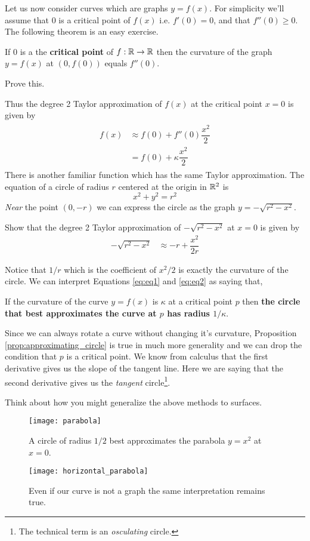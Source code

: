 Let us now consider curves which are graphs $y=f(x)$. For simplicity we'll assume that 0 is a critical point of $f(x)$ i.e. $f'(0) = 0$, and that $f''(0) \ge 0$. The following theorem is an easy exercise.
\begin{thm}
  If $0$ is a the \textbf{critical point} of $f: \mathbb{R} \rightarrow \mathbb{R}$ then the curvature of the graph $y=f(x)$ at $(0,f(0))$ equals ${f''(0)}$.
\end{thm}
\begin{ques}
	Prove this.
\end{ques}
\noindent Thus the degree 2 Taylor approximation of $ f(x) $ at the critical point $ x=0$ is given by
\begin{align}
	\label{eq:eq2}
	\begin{split}
	f(x) &\approx f(0) + f''(0) \dfrac{x^2}{2} \\
  &=f(0) + \kappa \dfrac{x^2}{2}
\end{split}
\end{align}
There is another familiar function which has the same Taylor approximation. The equation of a circle of radius $ r$ centered at the origin in $ \mathbb{R}^2$ is $$ x^2 + y^2 = r^2 $$
\emph{Near} the point $(0,-r)$ we can express the circle as the graph $ y = -\sqrt{r^2 - x^2}$.
\begin{ques}
	Show that the degree 2 Taylor approximation of $ -\sqrt{r^2 - x^2} $ at $ x=0$ is given by
	\begin{align}
		\label{eq:eq1}
		-\sqrt{r^2 - x^2} & \approx -r + \dfrac{x^2}{2r}
	\end{align}
\end{ques}
Notice that $ 1/r$ which is the coefficient of $ x^2/2$ is exactly the curvature of the circle. We can interpret Equations \eqref{eq:eq1} and \eqref{eq:eq2} as saying that,
\begin{prop}
	\label{prop:approximating_circle}
	 If the curvature of the curve $ y=f(x)$ is $ \kappa$ at a critical point $p$ then \textbf{the circle that best approximates the curve at $p$ has radius $ 1/\kappa$}.
\end{prop}
Since we can always rotate a curve without changing it's curvature, Proposition \ref{prop:approximating_circle} is true in much more generality and we can drop the condition that $p$ is a critical point. We know from calculus that the first derivative gives us the slope of the tangent line. Here we are saying that the second derivative gives us the \emph{tangent} circle\footnote{The technical term is an \emph{osculating} circle.}.
\begin{ques}
	Think about how you might generalize the above methods to surfaces.
\end{ques}
\begin{figure}[H]
	\centering
		\texttt{[image: parabola]}
		\caption{A circle of radius $1/2$ best approximates the parabola $y=x^2$ at $x=0$.}
\end{figure}
\begin{figure}[H]
		\centering
		\texttt{[image: horizontal\_parabola]}
		\caption{Even if our curve is not a graph the same interpretation remains true.}
\end{figure}
